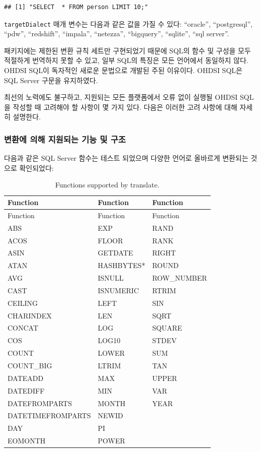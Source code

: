 \documentclass[10.5pt]{book}
\theoremstyle{definition}
\theoremstyle{definition}
\theoremstyle{definition}
\theoremstyle{remark}
\let\BeginKnitrBlock\begin \let\EndKnitrBlock\end
\begin{document}
\begin{verbatim}
## [1] "SELECT  * FROM person LIMIT 10;"
\end{verbatim}

\texttt{targetDialect} 매개 변수는 다음과 같은 값을 가질 수 있다:
``oracle'', ``postgresql'', ``pdw'', ``redshift'', ``impala'',
``netezza'', ``bigquery'', ``sqlite'', ``sql server''.

\BeginKnitrBlock{rmdimportant}
패키지에는 제한된 변환 규칙 세트만 구현되었기 때문에 SQL의 함수 및
구성을 모두 적절하게 번역하지 못할 수 있고, 일부 SQL의 특징은 모든
언어에서 동일하지 않다. OHDSI SQL이 독자적인 새로운 문법으로 개발된 주된
이유이다. OHDSI SQL은 SQL Server 구문을 유지하였다.
\EndKnitrBlock{rmdimportant}

최선의 노력에도 불구하고, 지원되는 모든 플랫폼에서 오류 없이 실행될
OHDSI SQL을 작성할 때 고려해야 할 사항이 몇 가지 있다. 다음은 이러한
고려 사항에 대해 자세히 설명한다.

\subsubsection*{변환에 의해 지원되는 기능 및 구조}\label{-----}

다음과 같은 SQL Server 함수는 테스트 되었으며 다양한 언어로 올바르게
변환되는 것으로 확인되었다: 

\begin{longtable}[]{@{}lll@{}}
\caption{\label{tab:sqlFunctions} Functions supported by
translate.}\tabularnewline
\toprule
Function & Function & Function\tabularnewline
\midrule
\endfirsthead
\toprule
Function & Function & Function\tabularnewline
\midrule
\endhead
ABS & EXP & RAND\tabularnewline
ACOS & FLOOR & RANK\tabularnewline
ASIN & GETDATE & RIGHT\tabularnewline
ATAN & HASHBYTES* & ROUND\tabularnewline
AVG & ISNULL & ROW\_NUMBER\tabularnewline
CAST & ISNUMERIC & RTRIM\tabularnewline
CEILING & LEFT & SIN\tabularnewline
CHARINDEX & LEN & SQRT\tabularnewline
CONCAT & LOG & SQUARE\tabularnewline
COS & LOG10 & STDEV\tabularnewline
COUNT & LOWER & SUM\tabularnewline
COUNT\_BIG & LTRIM & TAN\tabularnewline
DATEADD & MAX & UPPER\tabularnewline
DATEDIFF & MIN & VAR\tabularnewline
DATEFROMPARTS & MONTH & YEAR\tabularnewline
DATETIMEFROMPARTS & NEWID &\tabularnewline
DAY & PI &\tabularnewline
EOMONTH & POWER &\tabularnewline
\bottomrule
\end{longtable}
\end{document}
